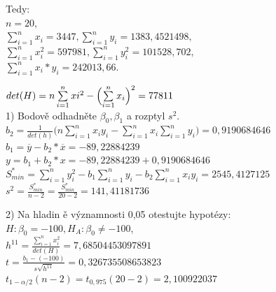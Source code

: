 \documentclass[11pt,a4paper]{article}
\newcommand\ddfrac[2]{\frac{\displaystyle #1}{\displaystyle #2}}
\begin{document}
Tedy: \\

$ n = 20,$ \\

$\sum\limits_{i=1}^n x_i = 3447, \sum\limits_{i=1}^n y_i = 1383,4521498, $ \\

$\sum\limits_{i=1}^{n} x_{i}^2 = 597981, \sum\limits_{i=1}^n y_{i}^2 = 101528,702, $ \\

$\sum\limits_{i=1}^n x_i * y_i = 242013,66. $

\newpage

$ det(H) = n \sum\limits_{i=1}^{n} x{i}^2 - \Bigl( \sum\limits_{i=1}^{n} x_i \Bigr)^2 = 77811$ \\

1) Bodově odhadněte $ \beta_0, \beta_1 $ a rozptyl $ s^2 $. \\

$ b_2 = \ddfrac{1}{det(h)} \biggl( n \sum\limits_{i=1}^{n} x_i y_i - \sum\limits_{i=1}^{n} x_i \sum\limits_{i=1}^{n} y_i \biggr) = 0,9190684646 $ \\

$ b_1 = \overline{y} - b_2 * \overline{x} = -89,22884239 $ \\

$ y = b_1 + b_2 * x = -89,22884239 + 0,9190684646 $ \\

$ S_{min}^{*} = \sum\limits_{i=1}^{n} y_{i}^2 - b_1 \sum\limits_{i=1}^n y_i - b_2 \sum\limits_{i=1}^n x_i y_i = 2545,4127125 $ \\

$ s^2 = \ddfrac{S_{min}^{*}}{n - 2} = \ddfrac{S_{min}^{*}}{20 - 2} = 141,41181736 $ \\
\vspace{0,7cm}

2) Na hladin ě významnosti 0,05 otestujte hypotézy: \\

$ H : \beta_0 = -100, H_A : \beta_0 \ne -100 $, \\

$ h^{11} = \ddfrac{\sum\limits_{i=1}^{n} x_{i}^2}{det(H)} = 7,68504453097891 $ \\

$ t = \ddfrac{b_1 - (-100)}{s\sqrt{h^{11}}} = 0,326735508653823 $ \\

$ t_{1-\alpha/2} (n - 2) = t_{0,975} (20 - 2) = 2,100922037 $ \\
\end{document}
